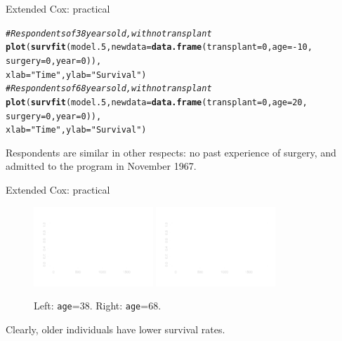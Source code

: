 \documentclass[12pt,english,pdf,xcolor=dvipsnames,aspectratio=169,handout]{beamer}\usepackage[]{graphicx}\usepackage[]{xcolor}
\makeatletter
\newcommand{\hlnum}[1]{\textcolor[rgb]{0.686,0.059,0.569}{#1}}%
\newcommand{\hlstr}[1]{\textcolor[rgb]{0.192,0.494,0.8}{#1}}%
\newcommand{\hlcom}[1]{\textcolor[rgb]{0.678,0.584,0.686}{\textit{#1}}}%
\newcommand{\hlopt}[1]{\textcolor[rgb]{0,0,0}{#1}}%
\newcommand{\hlstd}[1]{\textcolor[rgb]{0.345,0.345,0.345}{#1}}%
\newcommand{\hlkwc}[1]{\textcolor[rgb]{0.333,0.667,0.333}{#1}}%
\newcommand{\hlkwd}[1]{\textcolor[rgb]{0.737,0.353,0.396}{\textbf{#1}}}%
\newenvironment{kframe}{%
 \def\at@end@of@kframe{}%
 \ifinner\ifhmode%
  \def\at@end@of@kframe{\end{minipage}}%
  \begin{minipage}{\columnwidth}%
 \fi\fi%
 \def\FrameCommand##1{\hskip\@totalleftmargin \hskip-\fboxsep
 \colorbox{shadecolor}{##1}\hskip-\fboxsep
     \hskip-\linewidth \hskip-\@totalleftmargin \hskip\columnwidth}%
 \MakeFramed {\advance\hsize-\width
   \@totalleftmargin\z@ \linewidth\hsize
   \@setminipage}}%
 {\par\unskip\endMakeFramed%
 \at@end@of@kframe}
\newenvironment{knitrout}{}{} %
\makeatother
\begin{document}
\begin{frame}[fragile]{Extended Cox: practical}
\begin{knitrout}\scriptsize
{}\color{fgcolor}\begin{kframe}
\begin{alltt}
\hlcom{# Respondents of 38 years old, with no transplant}
\hlkwd{plot}\hlstd{(}\hlkwd{survfit}\hlstd{(model.5,} \hlkwc{newdata} \hlstd{=} \hlkwd{data.frame}\hlstd{(}\hlkwc{transplant} \hlstd{=} \hlnum{0}\hlstd{,} \hlkwc{age} \hlstd{=} \hlopt{-}\hlnum{10}\hlstd{,}
                                           \hlkwc{surgery} \hlstd{=} \hlnum{0}\hlstd{,} \hlkwc{year} \hlstd{=} \hlnum{0}\hlstd{)),}
     \hlkwc{xlab} \hlstd{=} \hlstr{"Time"}\hlstd{,} \hlkwc{ylab} \hlstd{=} \hlstr{"Survival"}\hlstd{)}
\hlcom{# Respondents of 68 years old, with no transplant}
\hlkwd{plot}\hlstd{(}\hlkwd{survfit}\hlstd{(model.5,} \hlkwc{newdata} \hlstd{=} \hlkwd{data.frame}\hlstd{(}\hlkwc{transplant} \hlstd{=} \hlnum{0}\hlstd{,} \hlkwc{age} \hlstd{=} \hlnum{20}\hlstd{,}
                                           \hlkwc{surgery} \hlstd{=} \hlnum{0}\hlstd{,} \hlkwc{year} \hlstd{=} \hlnum{0}\hlstd{)),}
     \hlkwc{xlab} \hlstd{=} \hlstr{"Time"}\hlstd{,} \hlkwc{ylab} \hlstd{=} \hlstr{"Survival"}\hlstd{)}
\end{alltt}
\end{kframe}
\end{knitrout}

Respondents are similar in other respects: no past experience of surgery, and admitted to the program in November 1967.



\end{frame}



\begin{frame}[fragile]{Extended Cox: practical}

\begin{figure}
\centering
\includegraphics[width=0.4\textwidth]{../03-graphs/02-09.pdf}
\includegraphics[width=0.4\textwidth]{../03-graphs/02-10.pdf}
\caption*{Left: \texttt{age}=38. Right: \texttt{age}=68.}
\end{figure}

Clearly, older individuals have lower survival rates.
\end{frame}
\end{document}
